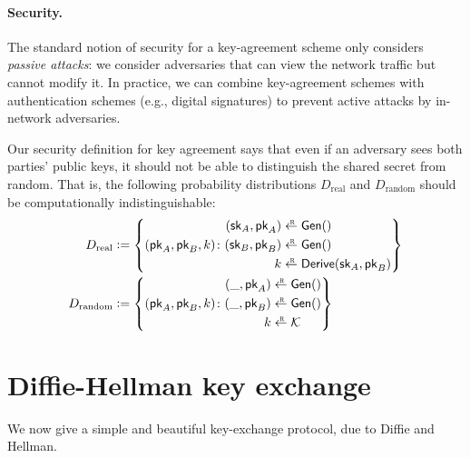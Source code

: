 \paragraph{Security.}
The standard notion of security for a key-agreement scheme
only considers \emph{passive attacks}:
we consider adversaries that can view the
network traffic but cannot modify it.
In practice, we can combine key-agreement
schemes with authentication schemes (e.g., digital signatures)
to prevent active attacks by in-network adversaries.

Our security definition for key agreement says that even
if an adversary sees both parties' public keys, it should
not be able to distinguish the shared secret from random.
That is, the following probability distributions
$D_\text{real}$ and $D_\text{random}$ should be 
computationally indistinguishable:
\begin{align*}
  D_\text{real} &\deq \left\{ 
(\pk_A, \pk_B, k) \colon  \begin{aligned}
  (\sk_A, \pk_A) &\getsr \Gen()\\
  (\sk_B, \pk_B) &\getsr \Gen()\\
  k &\getsr \Derive(\sk_A, \pk_B)
\end{aligned}
\right\} \\
  D_\text{random} &\deq \left\{ (\pk_A, \pk_B, k) \colon  \begin{aligned}
  (\_, \pk_A) &\getsr \Gen()\\
  (\_, \pk_B) &\getsr \Gen()\\
  k &\getsr \calK 
\end{aligned}
  \right\}
\end{align*}


\section{Diffie-Hellman key exchange}\label{sec:dh}
We now give a simple and beautiful key-exchange protocol, 
due to Diffie and Hellman.

